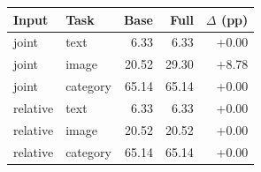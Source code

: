 \begin{tabular}{llrrr}
\toprule
Input & Task & Base & Full & $\Delta$ (pp) \\
\midrule
joint & text & 6.33 & 6.33 & +0.00 \\
joint & image & 20.52 & 29.30 & +8.78 \\
joint & category & 65.14 & 65.14 & +0.00 \\
relative & text & 6.33 & 6.33 & +0.00 \\
relative & image & 20.52 & 20.52 & +0.00 \\
relative & category & 65.14 & 65.14 & +0.00 \\
\bottomrule
\end{tabular}

